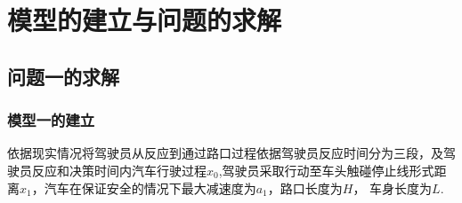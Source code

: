\documentclass[withoutpreface,bwprint]{cumcmthesis}
\newcommand{\headcol}[1]{\textbf{#1}} %
\begin{document}



 \newpage
\section{模型的建立与问题的求解}
\subsection{问题一的求解}
\subsubsection{模型一的建立}
依据现实情况将驾驶员从反应到通过路口过程依据驾驶员反应时间分为三段，及驾驶员反应和决策时间内汽车行驶过程$x_0$,驾驶员采取行动至车头触碰停止线形式距离$x_1$，汽车在保证安全的情况下最大减速度为$a_{1}$，路口长度为$H$， 车身长度为$L$.
\end{document}
